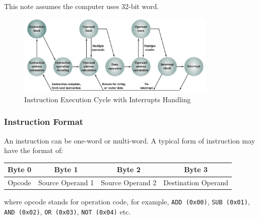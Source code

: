 \begin{remark}
    This note assumes the computer uses 32-bit word.
\end{remark}

\begin{figure}[H]
    \centering
    \includegraphics[width=0.85\textwidth]{chaps/instruction-execution-cycle/instruction-cycle-interrupts.png}
    \caption{Instruction Execution Cycle with Interrupts Handling}
\end{figure}

\subsubsection{Instruction Format}

An instruction can be one-word or multi-word. A typical form of instruction may have the
format of:
\begin{table}[H]
    \centering
    \begin{tabular}{cccc}
        Byte 0                       & Byte 1                                & Byte 2                                & Byte 3                                   \\ \hline
        \multicolumn{1}{|c|}{Opcode} & \multicolumn{1}{c|}{Source Operand 1} & \multicolumn{1}{c|}{Source Operand 2} & \multicolumn{1}{c|}{Destination Operand} \\ \hline
    \end{tabular}
\end{table}
where opcode stands for operation code, for example, \texttt{ADD (0x00)}, \texttt{SUB (0x01)},
\texttt{AND (0x02)}, \texttt{OR (0x03)}, \texttt{NOT (0x04)} etc.

